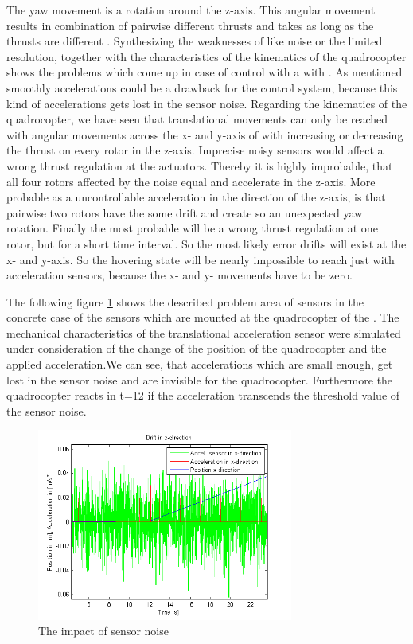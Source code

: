 The yaw movement is a rotation around the z-axis.
This angular movement results in combination of pairwise different thrusts and
takes as long as the thrusts are different
 .
\newline
Synthesizing the weaknesses of \MEMS like noise or the limited resolution,
together with the characteristics of the kinematics of the quadrocopter shows
the problems which come up in case of \MAV control with a \IMU with \MEMS. As
mentioned smoothly accelerations could be a drawback for the control system,
because this kind of accelerations gets lost in the sensor noise.
\newpage
 Regarding the kinematics of the quadrocopter, we have seen that translational
 movements can only be reached with angular movements across the x- and y-axis of with
increasing or decreasing the thrust on every rotor in the z-axis. Imprecise
noisy sensors would affect a wrong thrust regulation at the actuators. Thereby
it is highly improbable, that all four rotors affected by the noise equal and
accelerate in the z-axis. More probable as a uncontrollable acceleration in the
direction of the z-axis, is that pairwise two rotors have the some drift and
create so an unexpected yaw rotation. Finally the most probable will be a
wrong thrust regulation at one rotor, but for a short time interval. So the most
likely error drifts will exist at the x- and y-axis. So the hovering state will
be nearly impossible to reach just with \MEMS acceleration sensors, because the
x- and y- movements have to be zero. 

The following figure \ref{fig:ImpactOfNoise} shows the described problem area
 of \MEMS sensors in the concrete case of the sensors which are mounted at the
quadrocopter \CCU of the \HSE. The mechanical characteristics of the translational acceleration sensor
were simulated under consideration of the change of the position of the
quadrocopter and the applied acceleration.\newpage We can see, that
accelerations which are small enough, get lost in the sensor noise and are invisible for the
quadrocopter. Furthermore the quadrocopter reacts in t=12 if the
acceleration transcends the threshold value of the sensor noise.


\begin{figure}[!htbp]
	\centering
		\includegraphics[width=0.75\textwidth]{graphic/ImpactOfNoise.png}
	\caption{The impact of sensor noise}
	\label{fig:ImpactOfNoise}
\end{figure}
